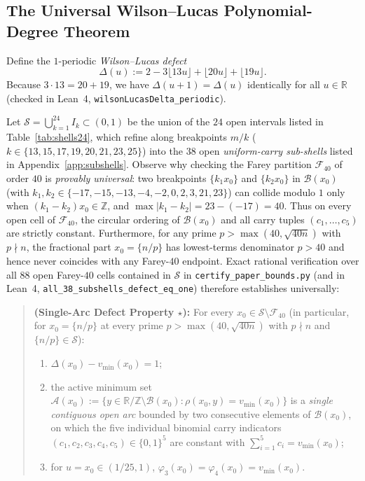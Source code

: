 \documentclass[11pt,reqno]{amsart}
\theoremstyle{definition}
\theoremstyle{remark}
\newcommand{\ZZ}{\mathbb{Z}}
\newcommand{\RR}{\mathbb{R}}
\begin{document}
\subsection{The Universal Wilson--Lucas Polynomial-Degree Theorem}
Define the $1$-periodic \emph{Wilson--Lucas defect}
\begin{equation}
\label{eq:Delta}
  \Delta(u) := 2 - 3\lfloor 13u \rfloor + \lfloor 20u \rfloor + \lfloor 19u \rfloor.
\end{equation}
Because $3 \cdot 13 = 20 + 19$, we have $\Delta(u + 1) = \Delta(u)$ identically for all $u \in \RR$ (checked in Lean~4, \texttt{wilsonLucasDelta\_periodic}).

Let $\mathcal{S} = \bigcup_{k=1}^{24} I_k \subset (0, 1)$ be the union of the $24$ open intervals listed in Table~\ref{tab:shells24}, which refine along breakpoints $m/k$ ($k \in \{13, 15, 17, 19, 20, 21, 23, 25\}$) into the $38$ open \emph{uniform-carry sub-shells} listed in Appendix~\ref{app:subshells}. Observe why checking the Farey partition $\mathcal{F}_{40}$ of order $40$ is \emph{provably universal}: two breakpoints $\{k_1 x_0\}$ and $\{k_2 x_0\}$ in $\mathcal{B}(x_0)$ (with $k_1, k_2 \in \{-17, -15, -13, -4, -2, \allowbreak 0, 2, 3, 21, 23\}$) can collide modulo $1$ only when $(k_1 - k_2)x_0 \in \ZZ$, and $\max |k_1 - k_2| = 23 - (-17) = 40$. Thus on every open cell of $\mathcal{F}_{40}$, the circular ordering of $\mathcal{B}(x_0)$ and all carry tuples $(c_1,\ldots,c_5)$ are strictly constant. Furthermore, for any prime $p > \max(40, \sqrt{40n})$ with $p \nmid n$, the fractional part $x_0 = \{n/p\}$ has lowest-terms denominator $p > 40$ and hence never coincides with any Farey-$40$ endpoint. Exact rational verification over all $88$ open Farey-$40$ cells contained in $\mathcal{S}$ in \texttt{certify\_paper\_bounds.py} (and in Lean~4, \texttt{all\_38\_subshells\_\-defect\_eq\_one}) therefore establishes universally:
\begin{quote}
  \textbf{(Single-Arc Defect Property $\star$):} For every $x_0 \in \mathcal{S} \setminus \mathcal{F}_{40}$ (in particular, for $x_0 = \{n/p\}$ at every prime $p > \max(40, \sqrt{40n})$ with $p \nmid n$ and $\{n/p\} \in \mathcal{S}$):
  \begin{enumerate}
    \item[(i)] $\Delta(x_0) - v_{\min}(x_0) = 1$;
    \item[(ii)] the active minimum set $\mathcal{A}(x_0) := \{y \in \RR/\ZZ \setminus \mathcal{B}(x_0) : \rho(x_0, y) = v_{\min}(x_0)\}$ is a \emph{single contiguous open arc} bounded by two consecutive elements of $\mathcal{B}(x_0)$, on which the five individual binomial carry indicators $(c_1, c_2, c_3, c_4, c_5) \in \{0, 1\}^5$ are constant with $\sum_{i=1}^5 c_i = v_{\min}(x_0)$;
    \item[(iii)] for $u = x_0 \in (1/25, 1)$, $\varphi_3(x_0) = \varphi_4(x_0) = v_{\min}(x_0)$.
  \end{enumerate}
\end{quote}
\end{document}
